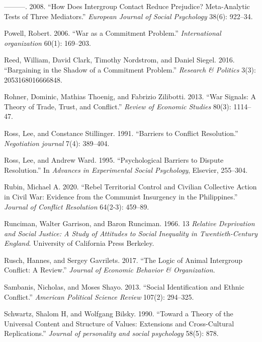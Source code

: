 \documentclass[11pt]{article}
\begin{document}
\leavevmode\hypertarget{ref-pettigrew2008does}{}%
---------. 2008. ``How Does Intergroup Contact Reduce Prejudice?
Meta-Analytic Tests of Three Mediators.'' \emph{European Journal of
Social Psychology} 38(6): 922--34.

\leavevmode\hypertarget{ref-powell2006war}{}%
Powell, Robert. 2006. ``War as a Commitment Problem.''
\emph{International organization} 60(1): 169--203.

\leavevmode\hypertarget{ref-reed2016bargaining}{}%
Reed, William, David Clark, Timothy Nordstrom, and Daniel Siegel. 2016.
``Bargaining in the Shadow of a Commitment Problem.'' \emph{Research \&
Politics} 3(3): 2053168016666848.

\leavevmode\hypertarget{ref-rohner2013war}{}%
Rohner, Dominic, Mathias Thoenig, and Fabrizio Zilibotti. 2013. ``War
Signals: A Theory of Trade, Trust, and Conflict.'' \emph{Review of
Economic Studies} 80(3): 1114--47.

\leavevmode\hypertarget{ref-ross1991barriers}{}%
Ross, Lee, and Constance Stillinger. 1991. ``Barriers to Conflict
Resolution.'' \emph{Negotiation journal} 7(4): 389--404.

\leavevmode\hypertarget{ref-ross1995psychological}{}%
Ross, Lee, and Andrew Ward. 1995. ``Psychological Barriers to Dispute
Resolution.'' In \emph{Advances in Experimental Social Psychology},
Elsevier, 255--304.

\leavevmode\hypertarget{ref-rubin2020rebel}{}%
Rubin, Michael A. 2020. ``Rebel Territorial Control and Civilian
Collective Action in Civil War: Evidence from the Communist Insurgency
in the Philippines.'' \emph{Journal of Conflict Resolution} 64(2-3):
459--89.

\leavevmode\hypertarget{ref-runciman1966relative}{}%
Runciman, Walter Garrison, and Baron Runciman. 1966. 13 \emph{Relative
Deprivation and Social Justice: A Study of Attitudes to Social
Inequality in Twentieth-Century England}. University of California Press
Berkeley.

\leavevmode\hypertarget{ref-rusch2017logic}{}%
Rusch, Hannes, and Sergey Gavrilets. 2017. ``The Logic of Animal
Intergroup Conflict: A Review.'' \emph{Journal of Economic Behavior \&
Organization}.

\leavevmode\hypertarget{ref-sambanis2013social}{}%
Sambanis, Nicholas, and Moses Shayo. 2013. ``Social Identification and
Ethnic Conflict.'' \emph{American Political Science Review} 107(2):
294--325.

\leavevmode\hypertarget{ref-schwartz1990toward}{}%
Schwartz, Shalom H, and Wolfgang Bilsky. 1990. ``Toward a Theory of the
Universal Content and Structure of Values: Extensions and Cross-Cultural
Replications.'' \emph{Journal of personality and social psychology}
58(5): 878.
\end{document}
